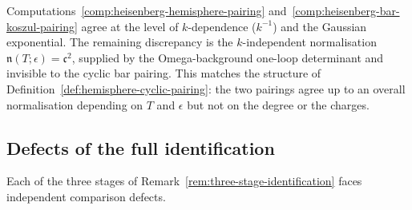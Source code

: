 \begin{remark}
\label{rem:heisenberg-base-case-verification}
Computations~\ref{comp:heisenberg-hemisphere-pairing}
and~\ref{comp:heisenberg-bar-koszul-pairing} agree at the level
of $k$-dependence ($k^{-1}$) and the Gaussian exponential. The
remaining discrepancy is the $k$-independent normalisation
$\mathfrak n(T;\epsilon) = \mathfrak c^2$, supplied by the
Omega-background one-loop determinant and invisible to the
cyclic bar pairing. This matches the structure of
Definition~\ref{def:hemisphere-cyclic-pairing}: the two pairings
agree up to an overall normalisation depending on $T$ and
$\epsilon$ but not on the degree or the charges.
\end{remark}

\subsection{Defects of the full identification}
\label{subsec:hemisphere-cyclic-obstructions}

Each of the three stages of
Remark~\ref{rem:three-stage-identification} faces independent
comparison defects.


